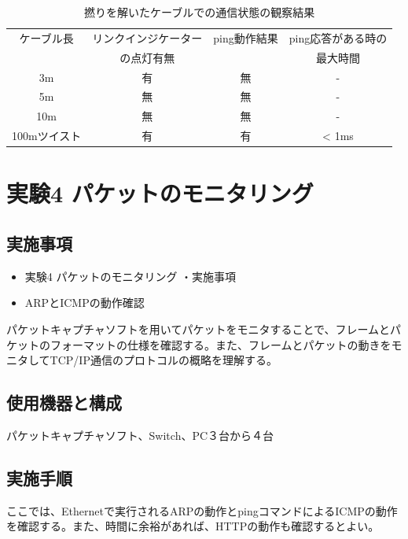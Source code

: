 \documentclass[10pt]{article}
\begin{document}
\begingroup
        \setlength{\tabcolsep}{5pt} %
        \renewcommand{\arraystretch}{1.5} %
        \begin{table}[H]
        \centering
    	\caption{撚りを解いたケーブルでの通信状態の観察結果}
    	\begin{tabular}{|c|c|c|c|}
    	    \hline
    	    ケーブル長 &  リンクインジケーター  & ping動作結果 & ping応答がある時の\\
    	    & の点灯有無 & & 最大時間\\ [0.5ex] 
    		\hline\hline
    			3m & 有 & 無 & - \\ \hline
    			5m & 無 & 無 & -\\ \hline
    			10m & 無 & 無 & -\\ \hline
            	100mツイスト & 有 & 有 & < 1ms\\ \hline
                
    	\end{tabular}
    \end{table} 
\endgroup

\pagebreak

\section{実験4 パケットのモニタリング}

\subsection{実施事項}

\begin{itemize}
    \item 実験4  パケットのモニタリング ・実施事項 　
    \item ARPとICMPの動作確認
\end{itemize}
パケットキャプチャソフトを用いてパケットをモニタすることで、フレームとパケットのフォーマットの仕様を確認する。また、フレームとパケットの動きをモニタしてTCP/IP通信のプロトコルの概略を理解する。

\subsection{使用機器と構成}
パケットキャプチャソフト、Switch、PC３台から４台

\subsection{実施手順}
ここでは、Ethernetで実行されるARPの動作とpingコマンドによるICMPの動作を確認する。また、時間に余裕があれば、HTTPの動作も確認するとよい。
\end{document}
